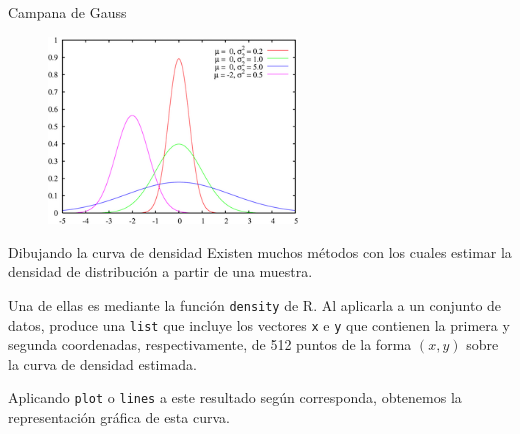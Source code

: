 \documentclass[
  ignorenonframetext,
  aspectratio=169]{beamer}
\begin{document}
\begin{frame}{Campana de Gauss}
\protect\hypertarget{campana-de-gauss-1}{}
\begin{figure}
\includegraphics[width=250px]{Imgs/gauss} \end{figure}
\end{frame}

\begin{frame}[fragile]{Dibujando la curva de densidad}
\protect\hypertarget{dibujando-la-curva-de-densidad}{}
Existen muchos métodos con los cuales estimar la densidad de
distribución a partir de una muestra.

Una de ellas es mediante la función \texttt{density} de R. Al aplicarla
a un conjunto de datos, produce una \texttt{list} que incluye los
vectores \texttt{x} e \texttt{y} que contienen la primera y segunda
coordenadas, respectivamente, de 512 puntos de la forma \((x,y)\) sobre
la curva de densidad estimada.

Aplicando \texttt{plot} o \texttt{lines} a este resultado según
corresponda, obtenemos la representación gráfica de esta curva.
\end{frame}
\end{document}
